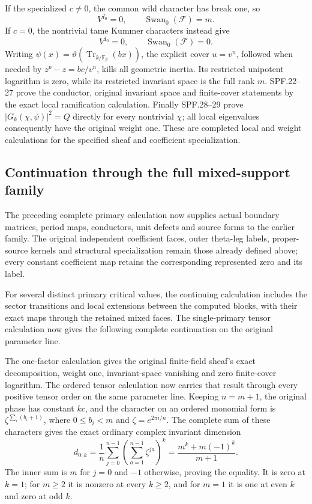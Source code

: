 If the specialized \(c\ne0\), the common wild character has break
one, so
\[
 V^{I_0}=0,\qquad \operatorname{Swan}_0(\mathcal F)=m.
\]
If \(c=0\), the nontrivial tame Kummer characters instead give
\[
 V^{I_0}=0,\qquad \operatorname{Swan}_0(\mathcal F)=0.
\]
Writing \(\psi(x)=\vartheta(\operatorname{Tr}_{k/\mathbb F_p}(bx))\),
the explicit cover \(u=v^n\), followed when needed by
\(z^p-z=bc/v^n\), kills all geometric inertia.  Its restricted
unipotent logarithm is zero, while its restricted invariant space
is the full rank \(m\).  SPF.22--27 prove the conductor, original
invariant space and finite-cover statements by the exact local
ramification calculation.
Finally SPF.28--29 prove
\(|G_k(\chi,\psi)|^2=Q\) directly for every nontrivial \(\chi\);
all local eigenvalues consequently have the original weight one.
These are completed local and weight calculations for the specified
sheaf and coefficient specialization.

\subsection{Continuation through the full mixed-support family}

The preceding complete primary calculation now supplies actual
boundary matrices, period maps, conductors, unit defects and source
forms to the earlier family.  The original independent coefficient
faces, outer theta-leg labels, proper-source kernels and structural
specialization remain those already defined above; every constant
coefficient map retains the corresponding represented zero and its
label.

For several distinct primary critical values, the continuing calculation
includes the sector transitions and local extensions between the computed
blocks, with their exact maps through the retained mixed faces.  The
single-primary tensor calculation now gives the following complete
continuation on the original parameter line.

The one-factor calculation gives the original finite-field sheaf's
exact decomposition, weight one, invariant-space vanishing and zero
finite-cover logarithm.  The ordered tensor calculation now carries
that result through every positive tensor order on the same parameter
line.  Keeping \(n=m+1\), the original phase has constant \(kc\),
and the character on an ordered monomial form is
\(\zeta^{\sum_i(b_i+1)}\), where \(0\leq b_i<m\) and
\(\zeta=e^{2\pi i/n}\).  The complete sum of these characters
gives the exact ordinary complex invariant dimension
\[
 d_{0,k}=\frac1n\sum_{j=0}^{n-1}
           \left(\sum_{a=1}^{n-1}\zeta^{ja}\right)^k
        =\frac{m^k+m(-1)^k}{m+1}.
 \tag{SPBT.1}\label{eq:spbt1}
\]
The inner sum is \(m\) for \(j=0\) and \(-1\) otherwise,
proving the equality.  It is zero at \(k=1\); for \(m\geq2\)
it is nonzero at every \(k\geq2\), and for \(m=1\) it is one
at even \(k\) and zero at odd \(k\).

